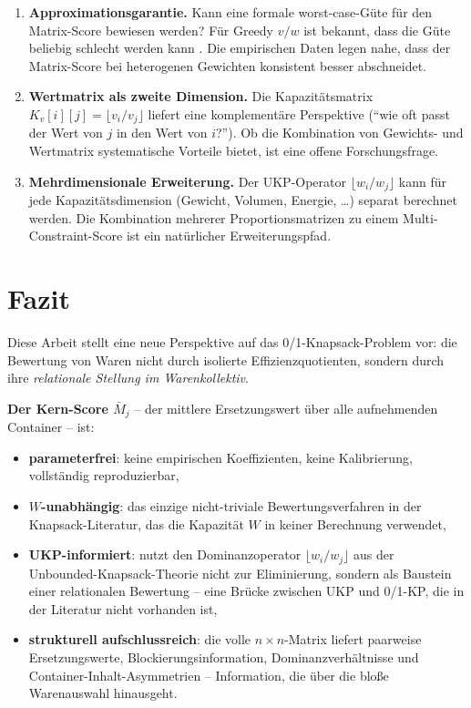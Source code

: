 \documentclass[a4paper,11pt]{article}
\begin{document}
\begin{enumerate}[leftmargin=*,topsep=2pt]
  \item \textbf{Approximationsgarantie.}
    Kann eine formale worst-case-Güte für den Matrix-Score
    bewiesen werden? Für Greedy $v/w$ ist bekannt, dass die Güte
    beliebig schlecht werden kann \citep{kellerer2004}.
    Die empirischen Daten legen nahe, dass der Matrix-Score bei
    heterogenen Gewichten konsistent besser abschneidet.
  \item \textbf{Wertmatrix als zweite Dimension.}
    Die Kapazitätsmatrix $K_v[i][j] = \lfloor v_i/v_j \rfloor$
    liefert eine komplementäre Perspektive (``wie oft passt
    der Wert von $j$ in den Wert von $i$?''). Ob die Kombination
    von Gewichts- und Wertmatrix systematische Vorteile bietet,
    ist eine offene Forschungsfrage.
  \item \textbf{Mehrdimensionale Erweiterung.}
    Der UKP-Operator $\lfloor w_i/w_j \rfloor$ kann für
    jede Kapazitätsdimension (Gewicht, Volumen, Energie, \ldots)
    separat berechnet werden. Die Kombination mehrerer
    Proportionsmatrizen zu einem Multi-Constraint-Score
    ist ein natürlicher Erweiterungspfad.
\end{enumerate}

\section{Fazit}

Diese Arbeit stellt eine neue Perspektive auf das 0/1-Knapsack-Problem
vor: die Bewertung von Waren nicht durch isolierte Effizienzquotienten,
sondern durch ihre \emph{relationale Stellung im Warenkollektiv}.

\begin{mdframed}[backgroundcolor=matlight,linecolor=matblue,linewidth=1.2pt]
\textbf{Der Kern-Score $\bar{M}_j$} -- der mittlere Ersetzungswert
über alle aufnehmenden Container -- ist:
\begin{itemize}[leftmargin=*,topsep=4pt]
  \item \textbf{parameterfrei}: keine empirischen Koeffizienten,
    keine Kalibrierung, vollständig reproduzierbar,
  \item \textbf{$W$-unabhängig}: das einzige nicht-triviale
    Bewertungsverfahren in der Knapsack-Literatur, das die
    Kapazität $W$ in keiner Berechnung verwendet,
  \item \textbf{UKP-informiert}: nutzt den Dominanzoperator
    $\lfloor w_i/w_j \rfloor$ aus der Unbounded-Knapsack-Theorie
    \citep{kellerer2004,andonov2000} nicht zur Eliminierung,
    sondern als Baustein einer relationalen Bewertung --
    eine Brücke zwischen UKP und 0/1-KP, die in der Literatur
    nicht vorhanden ist,
  \item \textbf{strukturell aufschlussreich}: die volle
    $n \times n$-Matrix liefert paarweise Ersetzungswerte,
    Blockierungsinformation, Dominanzverhältnisse und
    Container-Inhalt-Asymmetrien -- Information, die über die
    bloße Warenauswahl hinausgeht.
\end{itemize}
\end{mdframed}
\end{document}
